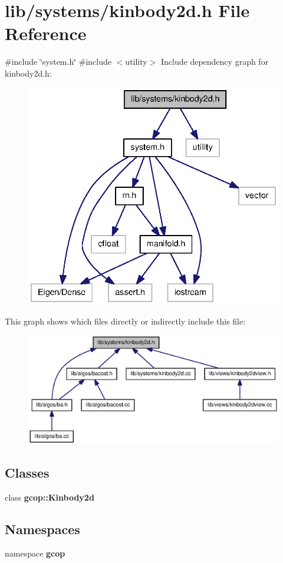 \section{lib/systems/kinbody2d.h \-File \-Reference}
\label{kinbody2d_8h}
{\ttfamily \#include \char`\"{}system.\-h\char`\"{}}\*
{\ttfamily \#include $<$utility$>$}\*
\-Include dependency graph for kinbody2d.\-h\-:
\nopagebreak
\begin{figure}[H]
\begin{center}
\leavevmode
\includegraphics[width=336pt]{kinbody2d_8h__incl}
\end{center}
\end{figure}
\-This graph shows which files directly or indirectly include this file\-:
\nopagebreak
\begin{figure}[H]
\begin{center}
\leavevmode
\includegraphics[width=350pt]{kinbody2d_8h__dep__incl}
\end{center}
\end{figure}
\subsection*{\-Classes}
\begin{DoxyCompactItemize}
\item 
class {\bf gcop\-::\-Kinbody2d}
\end{DoxyCompactItemize}
\subsection*{\-Namespaces}
\begin{DoxyCompactItemize}
\item 
namespace {\bf gcop}
\end{DoxyCompactItemize}
